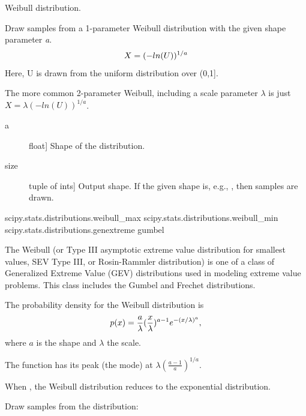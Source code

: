 \documentclass[letterpaper,10pt,english]{sphinxmanual}
\begin{document}
\begin{fulllineitems}
\label{pygeomod:pygeomod.geomodeller_xml_obj.weibull}
Weibull distribution.

Draw samples from a 1-parameter Weibull distribution with the given
shape parameter \emph{a}.
\begin{gather}
\begin{split}X = (-ln(U))^{1/a}\end{split}\notag
\end{gather}
Here, U is drawn from the uniform distribution over (0,1{]}.

The more common 2-parameter Weibull, including a scale parameter
\(\lambda\) is just \(X = \lambda(-ln(U))^{1/a}\).
\begin{description}
\item[{a}] \leavevmode{[}float{]}
Shape of the distribution.

\item[{size}] \leavevmode{[}tuple of ints{]}
Output shape.  If the given shape is, e.g., , then
 samples are drawn.

\end{description}

scipy.stats.distributions.weibull\_max
scipy.stats.distributions.weibull\_min
scipy.stats.distributions.genextreme
gumbel

The Weibull (or Type III asymptotic extreme value distribution for smallest
values, SEV Type III, or Rosin-Rammler distribution) is one of a class of
Generalized Extreme Value (GEV) distributions used in modeling extreme
value problems.  This class includes the Gumbel and Frechet distributions.

The probability density for the Weibull distribution is
\begin{gather}
\begin{split}p(x) = \frac{a}
{\lambda}(\frac{x}{\lambda})^{a-1}e^{-(x/\lambda)^a},\end{split}\notag
\end{gather}
where \(a\) is the shape and \(\lambda\) the scale.

The function has its peak (the mode) at
\(\lambda(\frac{a-1}{a})^{1/a}\).

When , the Weibull distribution reduces to the exponential
distribution.

Draw samples from the distribution:


\end{fulllineitems}
\end{document}
